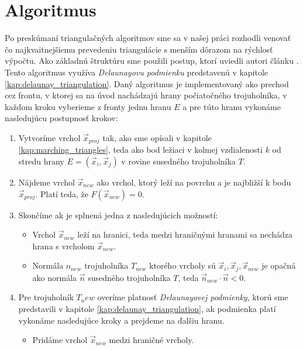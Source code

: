 \chapter{Algoritmus}

Po preskúmaní triangulačných algoritmov sme sa v našej práci rozhodli venovať čo najkvaitnejšiemu
prevedeniu triangulácie s menším dôrazom na rýchlosť výpočtu. Ako základnú štruktúru sme použili 
postup, ktorí uviedli autori článku \cite{hilton1996marching}. Tento algoritmus využíva 
\textit{Delaunayovu podmienku} predstavenú v kapitole \ref{kap:delaunay_triangulation}.
Daný algoritmus je implementovaný ako prechod cez frontu, v ktorej sa na úvod nachádzajú
hrany počiatočného trojuholníka, v každom kroku vyberieme z fronty jednu hranu $E$ a pre túto
hranu vykonáme nasledujúcu postupnosť krokov:
\begin{enumerate}
    \item{Vytvoríme vrchol $\overrightarrow{x}_{proj}$ tak, ako sme opísali v kapitole \ref{kap:marching_triangles}, teda 
    ako bod ležiaci v kolmej vzdialenosti $k$ od stredu hrany $E = (\overrightarrow{x}_i, \overrightarrow{x}_j)$ 
    v rovine susedného trojuholníka $T$.}
    \item{Nájdeme vrchol $\overrightarrow{x}_{new}$ ako vrchol, ktorý leží na povrchu a je najbližší k bodu 
    $\overrightarrow{x}_{proj}$. 
    Platí teda, že $F(\overrightarrow{x}_{new}) = 0$.}
    \item{Skončíme ak je splnená jedna z nasledujúcich možností:
    \begin{itemize}
        \item{Vrchol $\overrightarrow{x}_{new}$ leží na hranici, teda medzi hraničnými 
        hranami sa nechádza hrana s vrcholom $\overrightarrow{x}_{new}$.}
        \item{Normála $n_{new}$ trojuholníka $T_{new}$ ktorého vrcholy sú $\overrightarrow{x}_i, 
        \overrightarrow{x}_j, \overrightarrow{x}_{new}$ je opačná ako
        normála $\overrightarrow{n}$ susedného trojuholníka $T$, teda 
        $\overrightarrow{n}_{new} \cdot \overrightarrow{n} < 0$.}
    \end{itemize}
    }
    \item{Pre trojuholník $T_new$ overíme platnosť \textit{Delaunayovej podmienky}, 
    ktorú sme predstavili v kapitole \ref{kap:delaunay_triangulation}, ak podmienka platí
    vykonáme nasledujúce kroky a prejdeme na ďalšiu hranu.
    \begin{itemize}
        \item{Pridáme vrchol $\overrightarrow{x}_{new}$ medzi hraničné vrcholy.}

\end{itemize}}
\end{enumerate}
